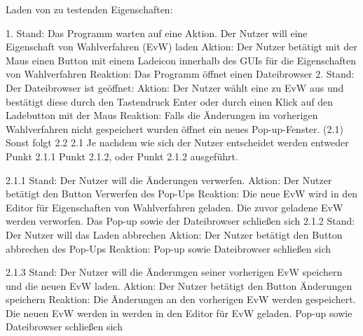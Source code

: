 \documentclass[a4paper]{scrreprt}
\begin{document}
Laden von zu testenden Eigenschaften:

1. Stand: Das Programm warten auf eine Aktion. Der Nutzer will eine Eigenschaft von
Wahlverfahren (EvW) laden
Aktion: Der Nutzer betätigt mit der Maus einen Button mit einem Ladeicon innerhalb des GUIs
für die Eigenschaften von Wahlverfahren
Reaktion: Das Programm öffnet einen Dateibrowser
2. Stand: Der Dateibrowser ist geöffnet:
Aktion: Der Nutzer wählt eine zu EvW aus und bestätigt diese durch den Tastendruck Enter oder
durch einen Klick auf den Ladebutton mit der Maus
Reaktion: Falls die Änderungen im vorherigen Wahlverfahren nicht gespeichert wurden öffnet ein
neues Pop-up-Fenster. (2.1) Sonst folgt 2.2
2.1 Je nachdem wie sich der Nutzer entscheidet werden entweder Punkt 2.1.1 Punkt 2.1.2, oder
Punkt 2.1.2 ausgeführt.

2.1.1 Stand: Der Nutzer will die Änderungen verwerfen.
Aktion: Der Nutzer betätigt den Button Verwerfen des Pop-Ups
Reaktion: Die neue EvW wird in den Editor für Eigenschaften von Wahlverfahren geladen.
Die zuvor geladene EvW werden verworfen. Das Pop-up sowie der
Dateibrowser schließen sich
2.1.2 Stand: Der Nutzer will das Laden abbrechen
Aktion: Der Nutzer betätigt den Button abbrechen des Pop-Ups
Reaktion: Pop-up sowie Dateibrowser schließen sich

2.1.3 Stand: Der Nutzer will die Änderungen seiner vorherigen EvW speichern und die neuen
EvW laden.
Aktion: Der Nutzer betätigt den Button Änderungen speichern
Reaktion: Die Änderungen an den vorherigen EvW werden gespeichert. Die neuen EvW
werden in werden in den Editor für EvW geladen. Pop-up sowie
Dateibrowser schließen sich
\end{document}
